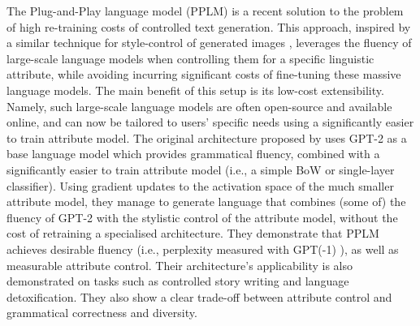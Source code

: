 The Plug-and-Play language model (PPLM) \citep{dathathri2019plug} is a recent solution to the problem of high re-training costs of controlled text generation. This approach, inspired by a similar technique for style-control of generated images \citep{nguyen2017plug}, leverages the fluency of large-scale language models when controlling them for a specific linguistic attribute, while avoiding incurring significant costs of fine-tuning these massive language models. The main benefit of this setup is its low-cost extensibility. Namely, such large-scale language models are often open-source and available online, and can now be tailored to users' specific needs using a significantly easier to train attribute model. 
The original architecture proposed by \citeauthor{dathathri2019plug} uses GPT-2 as a base language model which provides grammatical fluency, combined with a significantly easier to train attribute model (i.e., a simple BoW or single-layer classifier). Using gradient updates to the activation space of the much smaller attribute model, they manage to generate language that combines (some of) the fluency of GPT-2 with the stylistic control of the attribute model, without the cost of retraining a specialised architecture. They demonstrate that PPLM achieves desirable fluency (i.e., perplexity measured with GPT(-1) \citep{radford2018improving}), as well as measurable attribute control. Their architecture's applicability is also demonstrated on tasks such as controlled story writing and language detoxification. They also show a clear trade-off between attribute control and grammatical correctness and diversity. 





